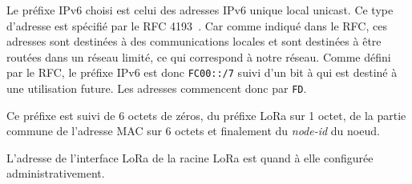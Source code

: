     Le préfixe IPv6 choisi est celui des adresses IPv6 unique local unicast. Ce type d'adresse est spécifié par le RFC 4193~\cite{rfc4193}. Car comme indiqué dans le RFC, ces adresses sont destinées à des communications locales et sont destinées à être routées dans un réseau limité, ce qui correspond à notre réseau. Comme défini par le RFC, le préfixe IPv6 est donc \texttt{FC00::/7} suivi d'un bit à qui est destiné à une utilisation future. Les adresses commencent donc par \texttt{FD}.

    Ce préfixe est suivi de 6 octets de zéros, du préfixe LoRa sur 1 octet, de la partie commune de l'adresse MAC sur 6 octets et finalement du \textit{node-id} du noeud.

    L'adresse de l'interface LoRa de la racine LoRa est quand à elle configurée administrativement.